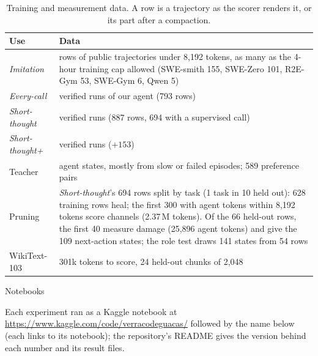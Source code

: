 \documentclass[10pt,twocolumn]{article}
\makeatletter
\newcommand{\ad}[1]{\textit{#1}}   %
\renewcommand\section{\@startsection{section}{1}{\z@}{-2.2ex \@plus -.6ex \@minus -.2ex}{1.1ex \@plus .2ex}%
  {\normalfont\large\bfseries}}
\makeatother
\begin{document}
\begin{table}[!ht]
  \centering
  \caption{Training and measurement data. A row is a trajectory as the scorer renders it, or its part after a
  compaction.}
  \label{tab:data}
  \footnotesize
  \setlength{\tabcolsep}{3pt}
  \begin{tabularx}{\columnwidth}{@{}>{\raggedright\arraybackslash}p{0.78in}>{\raggedright\arraybackslash}X@{}}
    \toprule
    Use & Data \\
    \midrule
    \ad{Imitation} & 320 rows of public trajectories under 8,192 tokens, as many as the 4-hour training cap allowed
    (SWE-smith 155, SWE-Zero 101, R2E-Gym 53, SWE-Gym 6, Qwen 5) \\
    \ad{Every-call} & 422 verified runs of our agent (793 rows) \\
    \ad{Short-thought} & 458 verified runs (887 rows, 694 with a supervised call) \\
    \ad{Short-thought+} & 611 verified runs ($+153$) \\
    Teacher & 717 agent states, mostly from slow or failed episodes; 589 preference pairs \\
    Pruning & \ad{Short-thought}'s 694 rows split by task (1 task in 10 held out): 628 training rows heal; the first 300
    with agent tokens within 8,192 tokens score channels (2.37\,M tokens). Of the 66 held-out rows, the first 40 measure
    damage (25,896 agent tokens) and give the 109 next-action states; the role test draws 141 states from 54 rows \\
    WikiText-103 & 301k tokens to score, 24 held-out chunks of 2,048 \\
    \bottomrule
  \end{tabularx}
\end{table}

\section{Notebooks}\label{app:notebooks}
\raggedright   %

Each experiment ran as a Kaggle notebook at \url{https://www.kaggle.com/code/verracodeguacas/} followed by the name
below (each links to its notebook); the repository's README gives the version behind each number and its result
files.
\end{document}

